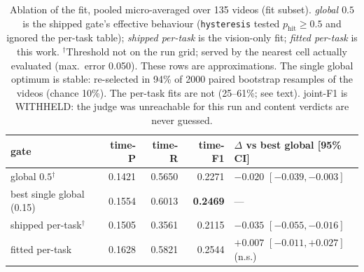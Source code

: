 \begin{table}[t]
\centering
\small
\caption{Ablation of the fit, pooled micro-averaged over 135 videos (fit subset). \emph{global $0.5$} is the shipped gate's effective behaviour (\texttt{hysteresis} tested $p_{\mathrm{hit}}\!\ge\!0.5$ and ignored the per-task table); \emph{shipped per-task} is the vision-only fit; \emph{fitted per-task} is this work. $^{\dagger}$Threshold not on the run grid; served by the nearest cell actually evaluated (max.\ error 0.050). These rows are approximations. The single global optimum is stable: re-selected in 94\% of 2000 paired bootstrap resamples of the videos (chance 10\%). The per-task fits are not (25--61\%; see text). joint-F1 is WITHHELD: the judge was unreachable for this run and content verdicts are never guessed.}
\label{tab:ablation}
\begin{tabular}{lrrrl}
\toprule
gate & time-P & time-R & time-F1 & $\Delta$ vs best global [95\% CI] \\
\midrule
global $0.5$$^{\dagger}$ & 0.1421 & 0.5650 & 0.2271 & $-0.020$ $[-0.039,-0.003]$ \\
best single global (0.15) & 0.1554 & 0.6013 & \textbf{0.2469} & --- \\
shipped per-task$^{\dagger}$ & 0.1505 & 0.3561 & 0.2115 & $-0.035$ $[-0.055,-0.016]$ \\
fitted per-task & 0.1628 & 0.5821 & 0.2544 & $+0.007$ $[-0.011,+0.027]$\,(n.s.) \\
\bottomrule
\end{tabular}
\end{table}
